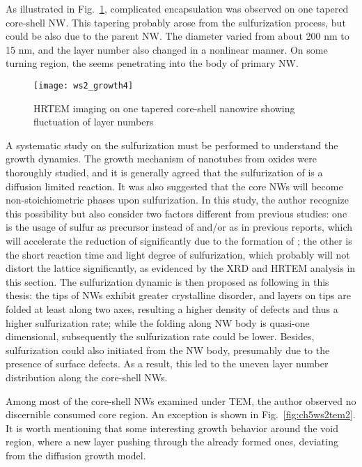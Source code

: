 As illustrated in Fig.~\ref{fig:ch5ws2tem4}, complicated  encapsulation was observed on one tapered core-shell NW. This tapering probably arose from the sulfurization process, but could be also due to the parent  NW. The diameter varied from about 200 nm to 15 nm, and the  layer number also changed in a nonlinear manner. On some turning region, the  seems penetrating into the body of primary  NW. 

\begin{figure}[htb]
\centering
\texttt{[image: ws2\_growth4]}
\caption[TEM imaging on core-shell NWs: 3]{HRTEM imaging on one tapered core-shell nanowire showing fluctuation of layer numbers}
\label{fig:ch5ws2tem4}
\end{figure}


A systematic study on the sulfurization must be performed to understand the growth dynamics. The growth mechanism of  nanotubes from oxides were thoroughly studied,\cite{Feldman1998} and it is generally agreed that the sulfurization of  is a diffusion limited reaction.\cite{Feldman1996} It was also suggested that the core  NWs will become non-stoichiometric phases upon sulfurization.\cite{Feldman1996,ZAK2009} In this study, the author recognize this possibility but also consider two factors different from previous studies: one is the usage of sulfur as precursor instead of  and/or  as in previous reports, which will accelerate the reduction of  significantly due to the formation of ; the other is the short reaction time and light degree of sulfurization, which probably will not distort the  lattice significantly, as evidenced by the XRD and HRTEM analysis in this section. The sulfurization dynamic is then proposed as following in this thesis: the tips of  NWs exhibit greater crystalline disorder, and  layers on tips are folded at least along two axes, resulting a higher density of defects and thus a higher sulfurization rate; while the folding along NW body is quasi-one dimensional, subsequently the sulfurization rate could be lower. Besides, sulfurization could also initiated from the NW body, presumably due to the presence of surface defects. As a result, this led to the uneven  layer number distribution along the core-shell NWs.

Among most of the core-shell NWs examined under TEM, the author observed no discernible consumed core region. An exception is shown in Fig.~\ref{fig:ch5ws2tem2}. It is worth mentioning that some interesting growth behavior around the void region, where a new  layer pushing through the already formed  ones, deviating from the diffusion growth model. 

